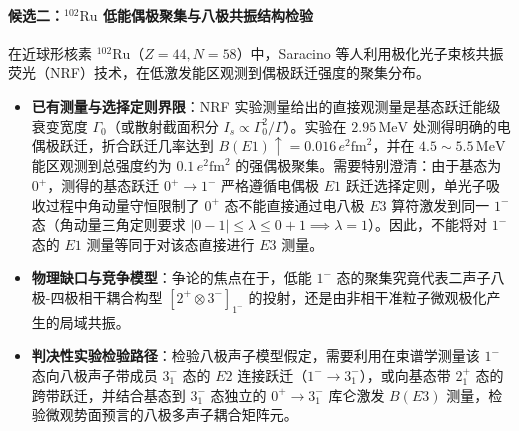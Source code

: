 \paragraph{候选二：$^{102}\mathrm{Ru}$ 低能偶极聚集与八极共振结构检验}
在近球形核素 $^{102}\mathrm{Ru}$（$Z=44, N=58$）中，Saracino 等人利用极化光子束核共振荧光（NRF）技术，在低激发能区观测到偶极跃迁强度的聚集分布。\cite{saracino_2026_102ru_dipole}
\begin{itemize}
\item \textbf{已有测量与选择定则界限}：NRF 实验测量给出的直接观测量是基态跃迁能级衰变宽度 $\Gamma_0$（或散射截面积分 $I_s \propto \Gamma_0^2/\Gamma$）。实验在 $2.95\,\mathrm{MeV}$ 处测得明确的电偶极跃迁，折合跃迁几率达到 $B(E1)\!\uparrow = 0.016\,e^2\mathrm{fm}^2$，并在 $4.5\sim 5.5\,\mathrm{MeV}$ 能区观测到总强度约为 $0.1\,e^2\mathrm{fm}^2$ 的强偶极聚集。需要特别澄清：由于基态为 $0^+$，测得的基态跃迁 $0^+ \to 1^-$ 严格遵循电偶极 $E1$ 跃迁选择定则，单光子吸收过程中角动量守恒限制了 $0^+$ 态不能直接通过电八极 $E3$ 算符激发到同一 $1^-$ 态（角动量三角定则要求 $|0 - 1| \le \lambda \le 0 + 1 \implies \lambda = 1$）。因此，不能将对 $1^-$ 态的 $E1$ 测量等同于对该态直接进行 $E3$ 测量。
\item \textbf{物理缺口与竞争模型}：争论的焦点在于，低能 $1^-$ 态的聚集究竟代表二声子八极-四极相干耦合构型 $[2^+ \otimes 3^-]_{1^-}$ 的投射，还是由非相干准粒子微观极化产生的局域共振。
\item \textbf{判决性实验检验路径}：检验八极声子模型假定，需要利用在束谱学测量该 $1^-$ 态向八极声子带成员 $3_1^-$ 态的 $E2$ 连接跃迁（$1^- \to 3_1^-$），或向基态带 $2_1^+$ 态的跨带跃迁，并结合基态到 $3_1^-$ 态独立的 $0^+ \to 3_1^-$ 库仑激发 $B(E3)$ 测量，检验微观势面预言的八极多声子耦合矩阵元。
\end{itemize}

